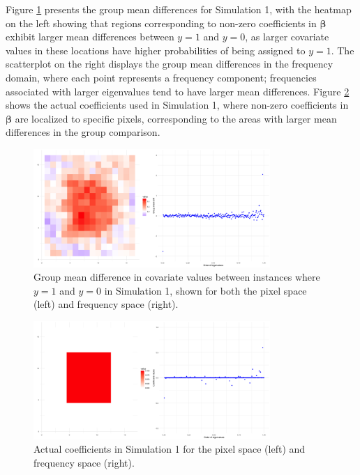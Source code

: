 \documentclass[12pt]{article}
\begin{document}
Figure \ref{fig:group_diff1} presents the group mean differences for Simulation 1, with the heatmap on the left showing that regions corresponding to non-zero coefficients in \( \boldsymbol{\beta} \) exhibit larger mean differences between \( y = 1 \) and \( y = 0 \), as larger covariate values in these locations have higher probabilities of being assigned to \( y = 1 \). The scatterplot on the right displays the group mean differences in the frequency domain, where each point represents a frequency component; frequencies associated with larger eigenvalues tend to have larger mean differences. Figure \ref{fig:coefs_sim1} shows the actual coefficients used in Simulation 1, where non-zero coefficients in \( \boldsymbol{\beta} \) are localized to specific pixels, corresponding to the areas with larger mean differences in the group comparison.

\begin{figure}[h!]
	\centering
  \includegraphics[width=0.8\textwidth, height=0.35\textwidth]{group_mean_diff_sim1.png}
	\caption{Group mean difference in covariate values between instances where \( y = 1 \) and \( y = 0 \) in Simulation
		1, shown for both the pixel space (left) and frequency space (right).}
	\label{fig:group_diff1}
\end{figure}

\begin{figure}[h!]
	\centering
	\includegraphics[width=0.8\textwidth, height=0.35\textwidth]{actual_coefs_sim1.png}
	\caption{Actual coefficients in Simulation 1 for the pixel space (left) and frequency space (right).}
	\label{fig:coefs_sim1}
\end{figure}
\end{document}
